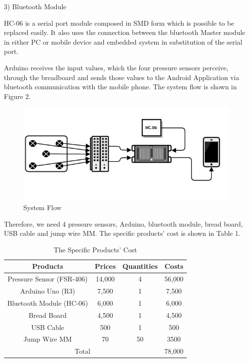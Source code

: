 \documentclass[conference]{IEEEtran}
\begin{document}
3)	Bluetooth Module

HC-06 is a serial port module composed in SMD form which is possible to be replaced easily. It also uses the connection between the bluetooth Master module in either PC or mobile device and embedded system in substitution of the serial port. 

Arduino receives the input values, which the four pressure sensors perceive, through the breadboard and sends those values to the Android Application via bluetooth communication with the mobile phone. The system flow is shown in Figure 2.\\

\begin{figure}[H]
\begin{center}
    \includegraphics[scale=0.4]{img_01.png}
    \caption{System Flow} 
\end{center}
\end{figure}

Therefore, we need 4 pressure sensors, Arduino, bluetooth module, bread board, USB cable and jump wire MM. The specific products' cost is shown in Table 1.\\
\begin{center}

\begin{table}[H]
\caption{The Specific Products' Cost }
\begin{tabular}{|c|c|c|c|}\hline


Products & Prices & Quantities & Costs \\ \hline \hline

Pressure Sensor (FSR-406) & 14,000 & 4 & 56,000  \\ \hline 

Arduino Uno (R3) & 7,500 & 1 & 7,500 \\ \hline

Bluetooth Module (HC-06) & 6,000 & 1  & 6,000 \\ \hline

Bread Board & 4,500 & 1 & 4,500 \\\hline

USB Cable & 500 & 1 & 500  \\ \hline

Jump Wire MM& 70 & 50 & 3500  \\ \hline

\multicolumn{3}{|c|}{Total} & \multicolumn{1}{|l|}{78,000} \\ \hline 

\end{tabular}
\end{table}
\end{center}
\end{document}
